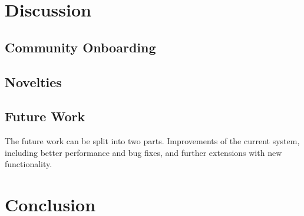 \section{Discussion}
\subsection{Community Onboarding}

\subsection{Novelties}

\subsection{Future Work}
The future work can be split into two parts. Improvements of the current system,
including better performance and bug fixes, and further extensions with new functionality.




\section{Conclusion}
